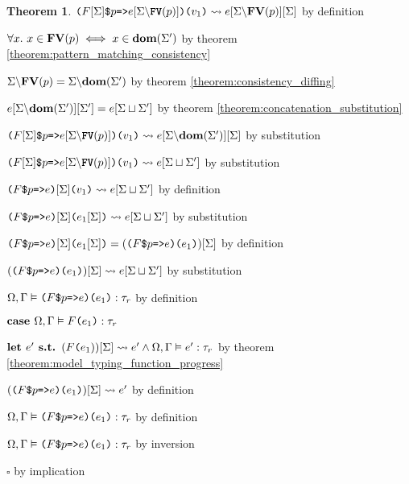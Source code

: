\documentclass[acmsmall]{acmart}
\theoremstyle{definition}
\newtheorem{theorem}{Theorem}[section]
\begin{document}
\begin{theorem}
      \item \Z\Z $\texttt{($F[\Sigma]$\$$p$=>$e[\Sigma\backslash\textbf{FV}(p)]$)($v_1$)} \rightsquigarrow e[\Sigma\backslash\textbf{FV}(p)][\Sigma]$ by definition 

      \item \Z\Z $\forall x .\ x \in \textbf{FV}(p) \iff x \in \textbf{dom}(\Sigma')$ 
      by theorem \ref{theorem:pattern_matching_consistency}
      \item \Z\Z $\Sigma\backslash\textbf{FV}(p) = \Sigma\backslash\textbf{dom}(\Sigma')$ 
      by theorem \ref{theorem:consistency_diffing}
      \item \Z\Z $e[\Sigma\backslash\textbf{dom}(\Sigma')][\Sigma'] = e[\Sigma \sqcup \Sigma']$ 
      by theorem \ref{theorem:concatenation_substitution}

      \item \Z\Z $\texttt{($F[\Sigma]$\$$p$=>$e[\Sigma\backslash\textbf{FV}(p)]$)($v_1$)} \rightsquigarrow e[\Sigma\backslash\textbf{dom}(\Sigma')][\Sigma]$ 
        by substitution
      \item \Z\Z $\texttt{($F[\Sigma]$\$$p$=>$e[\Sigma\backslash\textbf{FV}(p)]$)($v_1$)} \rightsquigarrow e[\Sigma \sqcup \Sigma']$ 
        by substitution 
      \item \Z\Z $\texttt{($F$\$$p$=>$e$)$[\Sigma]$($v_1$)} \rightsquigarrow e[\Sigma \sqcup \Sigma']$ by definition 
      \item \Z\Z $\texttt{($F$\$$p$=>$e$)$[\Sigma]$($e_1[\Sigma]$)} \rightsquigarrow e[\Sigma \sqcup \Sigma']$ by substitution  

      \item \Z\Z $\texttt{($F$\$$p$=>$e$)$[\Sigma]$($e_1[\Sigma]$)} = (\texttt{($F$\$$p$=>$e$)($e_1$)})[\Sigma]$ by definition  
      \item \Z\Z $(\texttt{($F$\$$p$=>$e$)($e_1$)})[\Sigma] \rightsquigarrow e[\Sigma \sqcup \Sigma']$ by substitution  

      \item \Z\Z $\Omega, \Gamma \vDash \texttt{($F$\$$p$=>$e$)($e_1$)} : \tau_r$ by definition

    \item \Z $\textbf{case } \Omega, \Gamma \vDash \texttt{$F$($e_1$)} : \tau_r$ 
      \item \Z\Z $\textbf{let } e' \textbf{ s.t. } (\texttt{$F$($e_1$}))[\Sigma] \rightsquigarrow e' \land \Omega, \Gamma \vDash e' : \tau_r$ by theorem \ref{theorem:model_typing_function_progress}
      \item \Z\Z $(\texttt{($F$\$$p$=>$e$)($e_1$)})[\Sigma] \rightsquigarrow e'$ by definition 
      \item \Z\Z $\Omega, \Gamma \vDash \texttt{($F$\$$p$=>$e$)($e_1$)} : \tau_r$ by definition
    \item \Z $\Omega, \Gamma \vDash \texttt{($F$\$$p$=>$e$)($e_1$)} : \tau_r$ by inversion 
  \item $\square$ by implication
\end{theorem}
\end{document}
